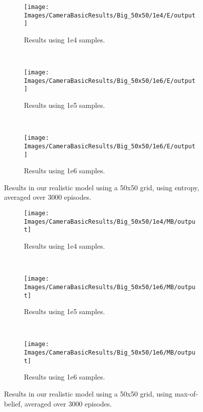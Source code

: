 \begin{figure}[ht]
        \centering
        \begin{subfigure}[t]{0.3\textwidth}
                \texttt{[image: Images/CameraBasicResults/Big\_50x50/1e4/E/output]}
                \caption{Results using 1e4 samples.}
                \label{fig:cwb4e}
        \end{subfigure}%
        ~ %
        \begin{subfigure}[t]{0.3\textwidth}
                \texttt{[image: Images/CameraBasicResults/Big\_50x50/1e6/E/output]}
                \caption{Results using 1e5 samples.}
                \label{fig:cwb5e}
        \end{subfigure}
        ~ %
        \begin{subfigure}[t]{0.3\textwidth}
                \texttt{[image: Images/CameraBasicResults/Big\_50x50/1e6/E/output]}
                \caption{Results using 1e6 samples.}
                \label{fig:cwb6e}
        \end{subfigure}
        \caption{Results in our realistic model using a 50x50 grid, using entropy, averaged over 3000 episodes.}\label{fig:cwbe}
\end{figure}

\begin{figure}[ht]
        \centering
        \begin{subfigure}[t]{0.3\textwidth}
                \texttt{[image: Images/CameraBasicResults/Big\_50x50/1e4/MB/output]}
                \caption{Results using 1e4 samples.}
                \label{fig:cwb4mb}
        \end{subfigure}%
        ~ %
        \begin{subfigure}[t]{0.3\textwidth}
                \texttt{[image: Images/CameraBasicResults/Big\_50x50/1e6/MB/output]}
                \caption{Results using 1e5 samples.}
                \label{fig:cwb5mb}
        \end{subfigure}
        ~ %
        \begin{subfigure}[t]{0.3\textwidth}
                \texttt{[image: Images/CameraBasicResults/Big\_50x50/1e6/MB/output]}
                \caption{Results using 1e6 samples.}
                \label{fig:cwb6mb}
        \end{subfigure}
        \caption{Results in our realistic model using a 50x50 grid, using max-of-belief, averaged over 3000 episodes.}\label{fig:cwbmb}
\end{figure}

